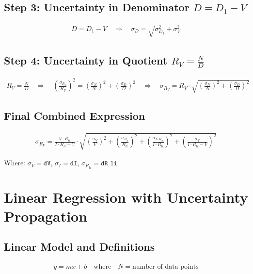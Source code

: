 \documentclass{article} %
\begin{document}
\subsection*{Step 3: Uncertainty in Denominator $D = D_1 - V$}
\begin{align*}
D = D_1 - V \quad \Rightarrow \quad \sigma_D = \sqrt{\sigma_{D_1}^2 + \sigma_V^2}
\end{align*}

\subsection*{Step 4: Uncertainty in Quotient $R_V = \frac{N}{D}$}
\begin{align*}
R_V = \frac{N}{D} \quad \Rightarrow \quad \left(\frac{\sigma_{R_V}}{R_V}\right)^2 = \left(\frac{\sigma_N}{N}\right)^2 + \left(\frac{\sigma_D}{D}\right)^2 \quad \Rightarrow \quad \sigma_{R_V} = R_V \cdot \sqrt{\left(\frac{\sigma_N}{N}\right)^2 + \left(\frac{\sigma_D}{D}\right)^2}
\end{align*}

\subsection*{Final Combined Expression}
\begin{align*}
\sigma_{R_V} = \frac{V \cdot R_{li}}{I \cdot R_{li} - V} \cdot \sqrt{\left(\frac{\sigma_V}{V}\right)^2 + \left(\frac{\sigma_{R_{li}}}{R_{li}}\right)^2 + \left(\frac{\sigma_{I \cdot R_{li}}}{I \cdot R_{li}}\right)^2 + \left(\frac{\sigma_V}{I \cdot R_{li} - V}\right)^2}
\end{align*}

Where: $\sigma_V = \texttt{dV}$, $\sigma_I = \texttt{dI}$, $\sigma_{R_{li}} = \texttt{dR\_li}$

\newpage

\section{Linear Regression with Uncertainty Propagation}
\label{app:c_linear_uncertainties}

\subsection*{Linear Model and Definitions}
\begin{align*}
y = mx + b \quad \text{where} \quad N = \text{number of data points}
\end{align*}
\end{document}
